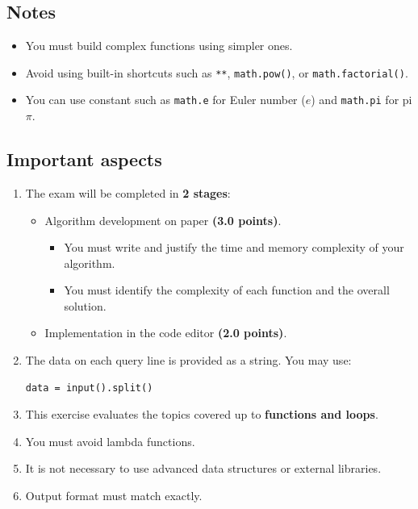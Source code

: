 \documentclass[11pt,a4paper]{article}
\begin{document}
\subsection*{Notes}

\begin{itemize}
  \item You must build complex functions using simpler ones.
  \item Avoid using built-in shortcuts such as \texttt{**}, \lstinline[style=pythonstyle]{math.pow()}, or \lstinline[style=pythonstyle]|math.factorial()|.
  \item You can use constant such as \lstinline[style=pythonstyle]|math.e| for Euler number (\(e\)) and \lstinline[style=pythonstyle]|math.pi| for pi \(\pi\).
\end{itemize}

\subsection*{Important aspects}

\begin{enumerate}
  \item The exam will be completed in \textbf{2 stages}:
        \begin{itemize}
          \item Algorithm development on paper \textbf{(3.0 points)}.
                \begin{itemize}
                  \item You must write and justify the time and memory complexity of your algorithm.
                  \item You must identify the complexity of each function and the overall solution.
                \end{itemize}
          \item Implementation in the code editor \textbf{(2.0 points)}.
        \end{itemize}

  \item The data on each query line is provided as a string. You may use:
\begin{lstlisting}[style=pythonstyle]
data = input().split()
\end{lstlisting}

  \item This exercise evaluates the topics covered up to \textbf{functions and loops}.

  \item You must avoid lambda functions.

  \item It is not necessary to use advanced data structures or external libraries.

  \item Output format must match exactly.
\end{enumerate}
\end{document}
